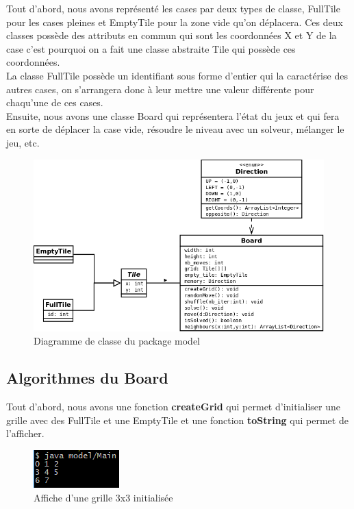 \documentclass[a4paper,12pt]{article} %
\begin{document}
Tout d'abord, nous avons représenté les cases par deux types de classe, FullTile pour les cases pleines et EmptyTile pour la zone vide qu'on déplacera. Ces deux classes possède des attributs en commun qui sont les coordonnées X et Y de la case c'est pourquoi on a fait une classe abstraite Tile qui possède ces coordonnées.\\
La classe FullTile possède un identifiant sous forme d'entier qui la caractérise des autres cases, on s'arrangera donc à leur mettre une valeur différente pour chaqu'une de ces cases.\\

Ensuite, nous avons une classe Board qui représentera l'état du jeux et qui fera en sorte de déplacer la case vide, résoudre le niveau avec un solveur, mélanger le jeu, etc.

\begin{figure}[!h]
\centering
\includegraphics[scale=0.4]{images/model.png}
\caption{Diagramme de classe du package model}
\end{figure}

\newpage

\subsection{Algorithmes du Board}

Tout d'abord, nous avons une fonction \textbf{createGrid} qui permet d'initialiser une grille avec des FullTile et une EmptyTile et une fonction \textbf{toString} qui permet de l'afficher.

\begin{figure}[!h]
\centering
\includegraphics[scale=1]{images/Capture2.PNG}
\caption{Affiche d'une grille 3x3 initialisée}
\end{figure}
\end{document}
